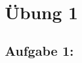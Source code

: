\documentclass{article}
\begin{document}
\section*{Übung 1}
    \subsection*{Aufgabe 1:}
\end{document}
